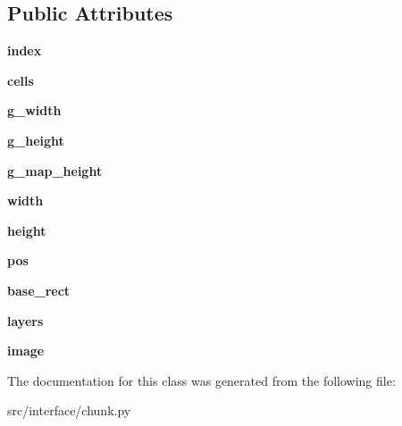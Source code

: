 \subsection*{\-Public \-Attributes}
\begin{DoxyCompactItemize}
\item 
\hypertarget{classinterface_1_1chunk_1_1_chunk_a9e9cffbaf114b74359d253ff31c0c5cd}{{\bfseries index}}\label{classinterface_1_1chunk_1_1_chunk_a9e9cffbaf114b74359d253ff31c0c5cd}

\item 
\hypertarget{classinterface_1_1chunk_1_1_chunk_ab22d666887dd6a32553bf295f505898e}{{\bfseries cells}}\label{classinterface_1_1chunk_1_1_chunk_ab22d666887dd6a32553bf295f505898e}

\item 
\hypertarget{classinterface_1_1chunk_1_1_chunk_a6e51c90bc606e659cdd545a6480bba9b}{{\bfseries g\-\_\-width}}\label{classinterface_1_1chunk_1_1_chunk_a6e51c90bc606e659cdd545a6480bba9b}

\item 
\hypertarget{classinterface_1_1chunk_1_1_chunk_a8dfa9db057a4891e8d512c331b612beb}{{\bfseries g\-\_\-height}}\label{classinterface_1_1chunk_1_1_chunk_a8dfa9db057a4891e8d512c331b612beb}

\item 
\hypertarget{classinterface_1_1chunk_1_1_chunk_aa13bd571b7c17aed303a19ba25b70e5b}{{\bfseries g\-\_\-map\-\_\-height}}\label{classinterface_1_1chunk_1_1_chunk_aa13bd571b7c17aed303a19ba25b70e5b}

\item 
\hypertarget{classinterface_1_1chunk_1_1_chunk_ad2925dfd3abda7f6c167f3913a8eeff8}{{\bfseries width}}\label{classinterface_1_1chunk_1_1_chunk_ad2925dfd3abda7f6c167f3913a8eeff8}

\item 
\hypertarget{classinterface_1_1chunk_1_1_chunk_a1d4d24ee8fbdb41168bea37b7e65c96e}{{\bfseries height}}\label{classinterface_1_1chunk_1_1_chunk_a1d4d24ee8fbdb41168bea37b7e65c96e}

\item 
\hypertarget{classinterface_1_1chunk_1_1_chunk_aada33185627c42d8e2a8252c49bb4348}{{\bfseries pos}}\label{classinterface_1_1chunk_1_1_chunk_aada33185627c42d8e2a8252c49bb4348}

\item 
\hypertarget{classinterface_1_1chunk_1_1_chunk_a89aee4adb10ca0001e03913adcc63fac}{{\bfseries base\-\_\-rect}}\label{classinterface_1_1chunk_1_1_chunk_a89aee4adb10ca0001e03913adcc63fac}

\item 
\hypertarget{classinterface_1_1chunk_1_1_chunk_a573d05a8d856b9c36bb0998fd1c63b63}{{\bfseries layers}}\label{classinterface_1_1chunk_1_1_chunk_a573d05a8d856b9c36bb0998fd1c63b63}

\item 
\hypertarget{classinterface_1_1chunk_1_1_chunk_a6a32dbe5b3215dc8209d9cc0e213ddfb}{{\bfseries image}}\label{classinterface_1_1chunk_1_1_chunk_a6a32dbe5b3215dc8209d9cc0e213ddfb}

\end{DoxyCompactItemize}


\-The documentation for this class was generated from the following file\-:\begin{DoxyCompactItemize}
\item 
src/interface/chunk.\-py\end{DoxyCompactItemize}
